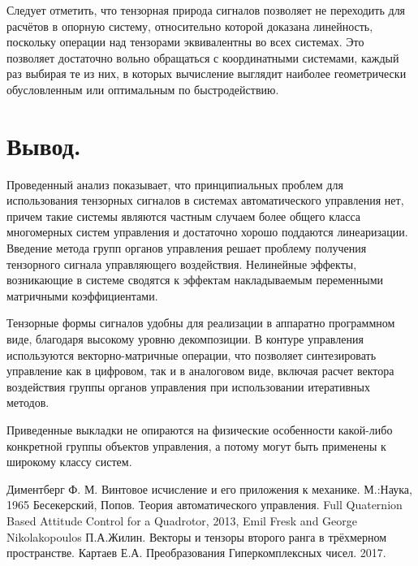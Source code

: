 \documentclass[a4paper]{article}
\begin{document}
Следует отметить, что тензорная природа сигналов позволяет не переходить для расчётов в опорную систему, относительно которой доказана линейность, поскольку операции над тензорами эквивалентны во всех системах. Это позволяет достаточно вольно обращаться с координатными системами, каждый раз выбирая те из них, в которых вычисление выглядит наиболее геометрически обусловленным или оптимальным по быстродействию.



\section{Вывод.}
Проведенный анализ показывает, что принципиальных проблем для использования тензорных сигналов в системах автоматического управления нет, причем такие системы являются частным случаем более общего класса многомерных систем управления и достаточно хорошо поддаются линеаризации. Введение метода групп органов управления решает проблему получения тензорного сигнала управляющего воздействия. Нелинейные эффекты, возникающие в системе сводятся к эффектам накладываемым переменными матричными коэффициентами.

Тензорные формы сигналов удобны для реализации в аппаратно программном виде, благодаря высокому уровню декомпозиции. В контуре управления используются векторно-матричные операции, что позволяет синтезировать управление как в цифровом, так и в аналоговом виде, включая расчет вектора воздействия группы органов управления при использовании итеративных методов. 

Приведенные выкладки не опираются на физические особенности какой-либо конкретной группы объектов управления, а потому могут быть применены к широкому классу систем. 



\begin{thebibliography}{9}
 Диментберг Ф. М. Винтовое исчисление и его приложения к механике. М.:Наука, 1965
 Бесекерский, Попов. Теория автоматического управления.
 Full Quaternion Based Attitude Control for a Quadrotor, 2013, Emil Fresk and George Nikolakopoulos
 П.А.Жилин. Векторы и тензоры второго ранга в трёхмерном пространстве.
 Картаев Е.А. Преобразования Гиперкомплексных чисел. 2017.

\end{thebibliography}
\end{document}
